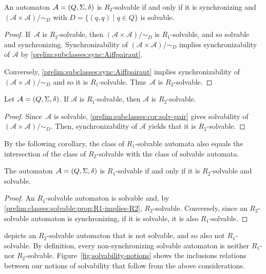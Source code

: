 \begin{proposition}
	An automaton $\mathcal A = (Q, \Sigma, \delta)$ is $R_2$-solvable
	if and only if it is synchronizing and $(\mathcal A \times \mathcal A) / {\sim_D}$
	with $D = \{(q,q) \mid q \in Q\}$ is solvable.
\end{proposition}
\begin{proof}
    If~$\mathcal A$ is $R_2$-solvable, then $(\mathcal A \times \mathcal A) / {\sim_D}$
    is $R_1$-solvable, and so solvable and synchronizing.
    Synchronizability of $(\mathcal A \times \mathcal A) / {\sim_D}$
    implies synchronizability of $\mathcal A$ by \cref{prelim:subclasses:sync:Aiffpairaut}.
        
    Conversely, \cref{prelim:subclasses:sync:Aiffpairaut}
    implies synchronizability of $(\mathcal A \times \mathcal A) / {\sim_D}$
    and so it is $R_1$-solvable. Thus~$\mathcal A$ is $R_2$-solvable.
\end{proof}

\begin{proposition} \label{prelim:classes:solvable:prop:R1-implies-R2}
	Let $\mathcal A = (Q, \Sigma, \delta)$.
	If $\mathcal A$ is $R_1$-solvable,
	then $\mathcal A$ is $R_2$-solvable.
\end{proposition}
\begin{proof}
    Since~$\mathcal A$ is solvable, \cref{prelim:subclasses:cor:solv-pair} gives solvability
	of $(\mathcal A \times \mathcal A ) / {\sim_D}$.
	Then, synchronizability of $\mathcal A$ yields that it is $R_2$-solvable.
\end{proof}

By the following corollary, the class of $R_1$-solvable automata also equals
the intersection of the class of $R_2$-solvable with the class of solvable automata.

\begin{corollary}
	The automaton $\mathcal A = (Q, \Sigma, \delta)$
	is $R_1$-solvable if and only if it is $R_2$-solvable and solvable.
\end{corollary}
\begin{proof}
 An $R_1$-solvable automaton is solvable and, by \cref{prelim:classes:solvable:prop:R1-implies-R2},
 $R_2$-solvable.
 Conversely, since an $R_2$-solvable automaton is synchronizing,
 if it is solvable, it is also $R_1$-solvable.	
\end{proof}

depicts an $R_2$-solvable automaton that is not solvable, and so also not $R_1$-solvable.
By definition, every non-synchronizing solvable automaton
is neither $R_1$- nor $R_2$-solvable. 
Figure~\ref{fig:solvability-notions} shows the inclusions relations
between our notions of solvability that follow from the above considerations.

